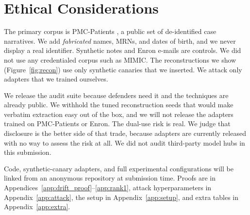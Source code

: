 \documentclass[11pt]{article}
\theoremstyle{plain}
\theoremstyle{definition}
\begin{document}
\section*{Ethical Considerations}

The primary corpus is PMC-Patients \citep{zhao2023pmcpatients}, a public set of de-identified case narratives.
We add \emph{fabricated} names, MRNs, and dates of birth, and we never display a real identifier.
Synthetic notes and Enron e-mails are controls.
We did not use any credentialed corpus such as MIMIC.
The reconstructions we show (Figure~\ref{fig:recon}) use only synthetic canaries that we inserted.
We attack only adapters that we trained ourselves.

We release the audit suite because defenders need it and the techniques are already public.
We withhold the tuned reconstruction seeds that would make verbatim extraction easy out of the box, and we will not release the adapters trained on PMC-Patients or Enron.
The dual-use risk is real. We judge that disclosure is the better side of that trade, because adapters are currently released with no way to assess the risk at all.
We did not audit third-party model hubs in this submission.

Code, synthetic-canary adapters, and full experimental configurations will be linked from an anonymous repository at submission time.
Proofs are in Appendices~\ref{app:drift_proof}--\ref{app:rank1}, attack hyperparameters in Appendix~\ref{app:attack}, the setup in Appendix~\ref{app:setup}, and extra tables in Appendix~\ref{app:extra}.

\end{document}
